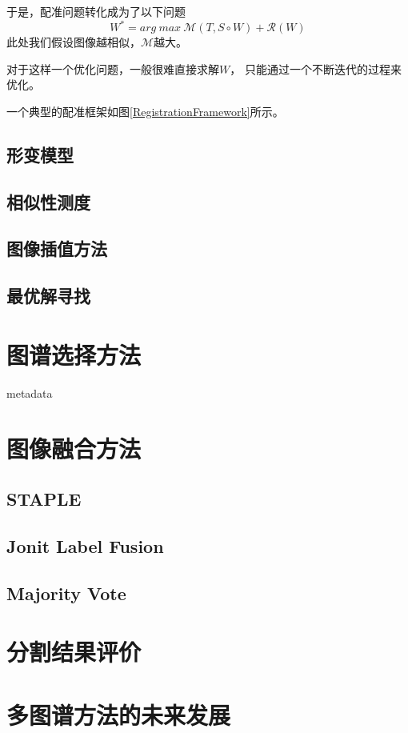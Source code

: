于是，配准问题转化成为了以下问题
$$W^\ast=arg \ max \ \mathcal{M}(T,S\circ W)+\mathcal{R}(W)$$
此处我们假设图像越相似，$\mathcal{M}$越大。

对于这样一个优化问题，一般很难直接求解$W$，
只能通过一个不断迭代的过程来优化。

一个典型的配准框架如图\ref{RegistrationFramework}所示。

\subsection{形变模型}
\subsection{相似性测度}
\subsection{图像插值方法}
\subsection{最优解寻找}

\section{图谱选择方法}
metadata\par

\section{图像融合方法}
\subsection{STAPLE}
\subsection{Jonit Label Fusion}
\subsection{Majority Vote}

\section{分割结果评价}

\section{多图谱方法的未来发展}


